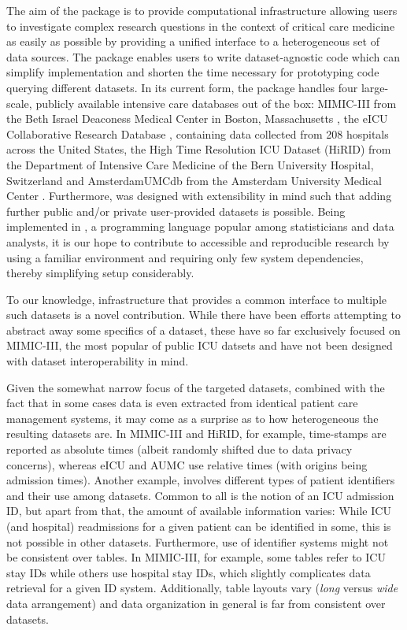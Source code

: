 \documentclass[
  notitle]{jss}
\begin{document}
The aim of the
\href{https://cran.r-project.org/package=ricu}{} package is to
provide computational infrastructure allowing users to investigate
complex research questions in the context of critical care medicine as
easily as possible by providing a unified interface to a heterogeneous
set of data sources. The package enables users to write dataset-agnostic
code which can simplify implementation and shorten the time necessary
for prototyping code querying different datasets. In its current form,
the package handles four large-scale, publicly available intensive care
databases out of the box: MIMIC-III from the Beth Israel Deaconess
Medical Center in Boston, Massachusetts \citep{johnson2016}, the eICU
Collaborative Research Database \citep{pollard2018}, containing data
collected from 208 hospitals across the United States, the High Time
Resolution ICU Dataset (HiRID) from the Department of Intensive Care
Medicine of the Bern University Hospital, Switzerland \citep{faltys2021}
and AmsterdamUMCdb from the Amsterdam University Medical Center
\citep{thoral2021}. Furthermore,  was designed with
extensibility in mind such that adding further public and/or private
user-provided datasets is possible. Being implemented in , a
programming language popular among statisticians and data analysts, it
is our hope to contribute to accessible and reproducible research by
using a familiar environment and requiring only few system dependencies,
thereby simplifying setup considerably.

To our knowledge, infrastructure that provides a common interface to
multiple such datasets is a novel contribution. While there have been
efforts \citep{adibuzzaman2016, wang2020} attempting to abstract away
some specifics of a dataset, these have so far exclusively focused on
MIMIC-III, the most popular of public ICU datsets and have not been
designed with dataset interoperability in mind.

Given the somewhat narrow focus of the targeted datasets, combined with
the fact that in some cases data is even extracted from identical
patient care management systems, it may come as a surprise as to how
heterogeneous the resulting datasets are. In MIMIC-III and HiRID, for
example, time-stamps are reported as absolute times (albeit randomly
shifted due to data privacy concerns), whereas eICU and AUMC use
relative times (with origins being admission times). Another example,
involves different types of patient identifiers and their use among
datasets. Common to all is the notion of an ICU admission ID, but apart
from that, the amount of available information varies: While ICU (and
hospital) readmissions for a given patient can be identified in some,
this is not possible in other datasets. Furthermore, use of identifier
systems might not be consistent over tables. In MIMIC-III, for example,
some tables refer to ICU stay IDs while others use hospital stay IDs,
which slightly complicates data retrieval for a given ID system.
Additionally, table layouts vary (\emph{long} versus \emph{wide} data
arrangement) and data organization in general is far from consistent
over datasets.
\end{document}
